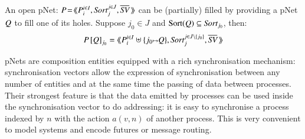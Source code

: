 \documentclass{elsarticle}
\begin{document}
\begin{definition}
	An open pNet: $\pNet \!=\! \mylangle \pNet_i^{i\in I}, \Sort_j^{j\in J}, 
	\set{\symb{SV}}\,\myrangle$
 can be (partially) filled by providing  a pNet $Q$ to fill one of  its holes.	
	Suppose $j_0\in J$ and $\Sortop(\pNetQ) \subseteq \Sort_{j_0}$, then: %
	\[\pNet\left[\pNetQ\right]_{j_0}= \mylangle 
	\pNet_i^{i\in I}\uplus\{j_0\mapsto \pNetQ\},\Sort_j^{j\in J\setminus \{j_0\}},
	\set{\symb{SV}}\,\myrangle
	\]
\end{definition}

pNets are composition entities equipped with a rich synchronisation mechanism: synchronisation vectors allow the expression of synchronisation between any number of entities and at the same time the passing of data between processes. Their strongest feature is that the data emitted by processes can be used  inside the synchronisation vector to do addressing: it is easy to synchronise a process indexed by $n$ with the action $a(v,n)$ of another process. This is very convenient to model systems and encode futures or message routing. 
\end{document}
